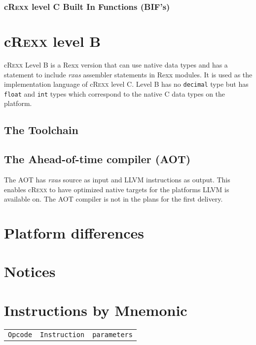 \documentclass[english,11pt,twoside,toc=bib,toc=idx]{scrreprt}
\newcommand{\crexx}{c\textsc{Rexx}}
\newcommand{\keyword}[1]{\texttt{#1}}
\begin{document}
\subsection{\crexx{} level C Built In Functions (BIF's)}


\chapter{\crexx{} level B}
\crexx{} Level B is a Rexx version that can use native data types and
has a statement to include \emph{rxas} assembler statements in Rexx
modules. It is used as the implementation language of \crexx{} level
C. Level B has no \keyword{decimal} type but has \keyword{float} and
\keyword{int} types which correspond to the native C data types on the platform. 




\section{The Toolchain}


\section{The Ahead-of-time compiler (AOT)}
The AOT has \emph{rxas} source as input and LLVM instructions as
output. This enables \crexx{} to have optimized native targets for the
platforms LLVM is available on. The AOT compiler is not in the plans
for the first delivery.

\appendix
\chapter{Platform differences}

\chapter{Notices}

\chapter{Instructions by Mnemonic}
\begin{longtable}{lll}
  \toprule
  \texttt{Opcode} & \texttt{Instruction} & \texttt{parameters} \\
  
\end{longtable}
\end{document}
